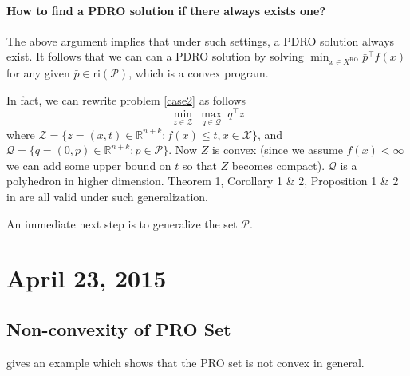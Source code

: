 \documentclass[10pt]{article}
\theoremstyle{plain}
\theoremstyle{definition}
\theoremstyle{remark}
\newcommand{\mcal}{\mathcal}
\newcommand{\tr}{^{\top}}
\newcommand{\subjectto}{\text{s.t.}}
\newcommand{\cP}{\mathcal{P}}
\newcommand{\R}{\mathbb{R}}
\begin{document}
\paragraph{How to find a PDRO solution if there always exists one?}
The above argument implies that under such settings, a PDRO solution always exist.
It follows that we can can a PDRO solution by solving
$\min_{x\in X^{\text{RO}}} \bar{p}\tr f(x)$ for any given $\bar{p}\in \text{ri}(\cP)$, which is a convex program.

{\color{blue}In fact, we can rewrite problem \eqref{case2} as follows
\begin{equation}\label{case2_tf}
\min_{z\in \mcal{Z}}~\max_{q\in \mcal{Q}}~q\tr z
\end{equation}
where $\mcal{Z} = \{z=(x,t)\in \R^{n+k}:f(x)\le t, x\in \mcal{X}\}$,
and $\mcal{Q} = \{q=(0,p)\in \R^{n+k}: p\in \mcal{P}\}$.
Now $Z$ is convex (since we assume $f(x)<\infty$ we can add some upper bound on $t$
so that $Z$ becomes compact). $\mcal{Q}$ is a polyhedron in higher dimension.
Theorem 1, Corollary 1 \& 2, Proposition 1 \& 2 in \citet{iancu2013pareto} are all valid under such generalization.

An immediate next step is to generalize the set $\cP$.
}

\section*{April 23, 2015}
\subsection*{Non-convexity of PRO Set}
\citet{iancu2013pareto} gives an example which shows that the PRO set is not convex in general. 



\newpage


\end{document}
